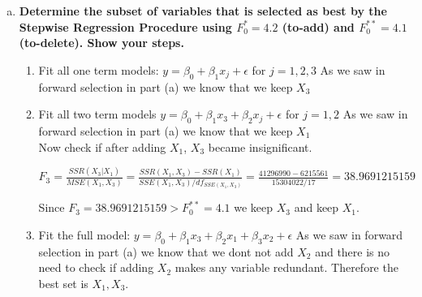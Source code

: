 \documentclass{article}
\begin{document}
\begin{enumerate}[1.]
\begin{enumerate}[(a)]
\item \textbf{Determine the subset of variables that is selected as best by the Stepwise Regression
Procedure using $F_0^* = 4.2$ (to-add) and $F_0^{**} = 4.1$ (to-delete). Show your steps. }

\begin{enumerate}[(1)]
\item Fit all one term models: $y= \beta_0 + \beta_1x_j + \epsilon$ for $j = 1,2,3$
As we saw in forward selection in part (a) we know that we keep $X_3$

\item Fit all two term models $y = \beta_0 + \beta_1x_3 + \beta_2x_j + \epsilon$ for $j = 1,2$
As we saw in forward selection in part (a) we know that we keep $X_1$ \\

Now check if after adding $X_1$, $X_3$ became insignificant. 

$F_3 = \frac{ SSR(X_3 | X_1) }{ MSE(X_1, X_3)} = \frac{ SSR(X_1, X_3) - SSR(X_1)}{SSE(X_1, X_3)/df_{SSE(X_1, X_3)}} = \frac{41 296 990 - 6 215 561}{15 304 022/ 17} = 38.9691215159$

Since $F_3 = 38.9691215159 > F_0^{**} = 4.1$ we keep  $X_3$ and keep $X_1$. 

\item Fit the full model: $y = \beta_0 + \beta_1x_3 + \beta_2x_1 + \beta_3x_2 + \epsilon$
As we saw in forward selection in part (a) we know that we dont not add $X_2$ and there is no need to check if adding $X_2$ makes any variable redundant. Therefore the best set is ${X_1, X_3}$.

\end{enumerate}

\end{enumerate}


\end{enumerate}
\end{document}
